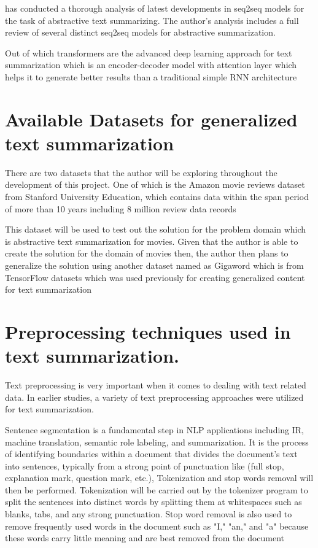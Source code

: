 \documentclass[manuscript,screen,natbib=false]{acmart}
\begin{document}
\cite{shi_keneshloo_ramakrishnan_reddy_2020} has conducted a thorough analysis of latest developments in seq2seq models for the task of abstractive text summarizing. The author's analysis includes a full review of several distinct seq2seq models for abstractive summarization.

Out of which transformers are the advanced deep learning approach for text summarization which is an encoder-decoder model with attention layer which helps it to generate better results than a traditional simple RNN architecture \cite{etemad_abidi_chhabra_2021}

\section{Available Datasets for generalized text summarization}
There are two datasets that the author will be exploring throughout the development of this project. One of which is the Amazon movie reviews dataset from Stanford University Education, which contains data within the span period of more than 10 years including 8 million review data records \cite{mcauley_leskovec_2013}

This dataset will be used to test out the solution for the problem domain which is abstractive text summarization for movies. Given that the author is able to create the solution for the domain of movies then, the author then plans to generalize the solution using another dataset named as Gigaword which is from TensorFlow datasets which was used previously for creating generalized content for text summarization \cite{kouris_alexandridis_stafylopatis_2019}

\section{Preprocessing techniques used in text summarization.}
Text preprocessing is very important when it comes to dealing with text related data. In earlier studies, a variety of text preprocessing approaches were utilized for text summarization. 

Sentence segmentation is a fundamental step in NLP applications including IR, machine translation, semantic role labeling, and summarization. It is the process of identifying boundaries within a document that divides the document's text into sentences, typically from a strong point of punctuation like (full stop, explanation mark, question mark, etc.), Tokenization and stop words removal will then be performed. Tokenization will be carried out by the tokenizer program to split the sentences into distinct words by splitting them at whitespaces such as blanks, tabs, and any strong punctuation. Stop word removal is also used to remove frequently used words in the document such as "I," "an," and "a" because these words carry little meaning and are best removed from the document \cite{khan_gul_zareei_biswal_zeb_naeem_saeed_salim_2020}
\end{document}
